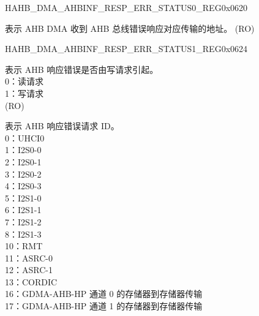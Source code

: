\begin{register}{H}{AHB\_DMA\_AHBINF\_RESP\_ERR\_STATUS0\_REG}{0x0620}\label{regdesc:AHBDMAAHBINFRESPERRSTATUS0REG}
%
\regnewline%
\begin{regdesc}\begin{reglist}
\label{fielddesc:AHBDMAAHBINFRESPERRADDR}\item [AHB\_DMA\_AHBINF\_RESP\_ERR\_ADDR] 表示 AHB DMA 收到 AHB 总线错误响应对应传输的地址。 (RO)
\end{reglist}\end{regdesc}
\end{register}


\begin{register}{H}{AHB\_DMA\_AHBINF\_RESP\_ERR\_STATUS1\_REG}{0x0624}\label{regdesc:AHBDMAAHBINFRESPERRSTATUS1REG}
%
%
%
%
\regnewline%
\begin{regdesc}\begin{reglist}
\label{fielddesc:AHBDMAAHBINFRESPERRWR}\item [AHB\_DMA\_AHBINF\_RESP\_ERR\_WR] 表示 AHB 响应错误是否由写请求引起。\\0：读请求\\1：写请求\\ (RO)
\label{fielddesc:AHBDMAAHBINFRESPERRID}\item [AHB\_DMA\_AHBINF\_RESP\_ERR\_ID] 表示 AHB 响应错误请求 ID。\\
0：UHCI0\\
1：I2S0-0\\
2：I2S0-1\\
3：I2S0-2\\
4：I2S0-3\\
5：I2S1-0\\
6：I2S1-1\\
7：I2S1-2\\
8：I2S1-3\\
10：RMT\\
11：ASRC-0\\
12：ASRC-1\\
13：CORDIC\\
16：GDMA-AHB-HP 通道 0 的存储器到存储器传输\\
17：GDMA-AHB-HP 通道 1 的存储器到存储器传输\\

\end{reglist}
\end{regdesc}
\end{register}
